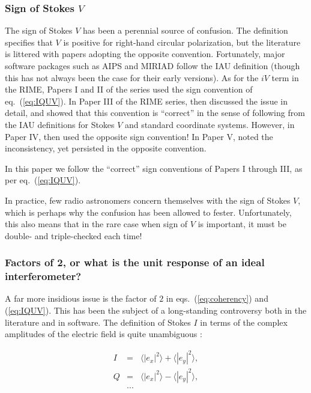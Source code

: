 \documentclass[]{aa}
\begin{document}
\subsubsection{Sign of Stokes $V$}

The sign of Stokes $V$ has been a perennial source of confusion. The \citet{IAU74} definition specifies that $V$ is positive for right-hand circular polarization, but the literature is littered with papers adopting the opposite convention. Fortunately, major software packages such as AIPS and MIRIAD follow the IAU definition (though this 
has not always been the case for their early versions). As for the $iV$ term in the RIME, Papers I and II of the series \citep{ME1,ME2} used the sign convention of eq.~(\ref{eq:IQUV}). In Paper III of the RIME series, \citet{ME3} then discussed the issue in detail, and showed that this convention is ``correct'' in the sense of following from the IAU definitions for Stokes $V$ and standard coordinate systems. However, in Paper IV, \citet{ME4} then used the opposite sign convention! In Paper V, \citet{ME5} noted the inconsistency, yet persisted in the opposite convention. 

In this paper we follow the ``correct'' sign conventions of Papers I through III, as per eq.~(\ref{eq:IQUV}).

In practice, few radio astronomers concern themselves with the sign of Stokes $V$, which is perhaps why the confusion has been allowed to fester. Unfortunately, this also means that in the rare case when sign of $V$ is important, it
must be double- and triple-checked each time!

\subsubsection{\label{sec:factor2}Factors of 2, or what is the unit response of an ideal interferometer?}

A far more insidious issue is the factor of $2$ in eqs.~(\ref{eq:coherency}) and (\ref{eq:IQUV}). This has been the subject of a long-standing controversy both in the literature and in software. The definition of Stokes $I$ in terms of the complex amplitudes of the electric field is quite unambiguous \citep{tms,born-wolf}:

\begin{eqnarray*}
I&=&\langle |e_x|^2\rangle  + \langle |e_y|^2\rangle , \\
Q&=&\langle |e_x|^2\rangle  - \langle |e_y|^2\rangle , \\
&...&
\end{eqnarray*}
\end{document}
